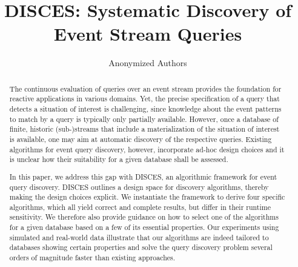 \documentclass[sigconf,review,screen]{acmart}
\newcommand{\sys}{DISCES\xspace}
\begin{document}
	\title{\sys{}: Systematic Discovery of Event Stream Queries}

	\author[Anonymized Authors]{Anonymized Authors}
	\affiliation{%
		\institution{}
		\city{\vspace{1cm}}
		\state{}
		\country{}
		\postcode{}
	}
	\email{}




\begin{abstract}
The continuous evaluation of queries over an event stream provides the
foundation for reactive applications in various domains. Yet, the precise
specification of a query that detects a situation of interest is challenging,
since knowledge about the event patterns to match by a query is typically only
partially available. However, once a database of finite, historic
(sub-)streams that include
a materialization of
the situation of interest is available, one may aim at automatic discovery of
the respective queries. Existing algorithms for event query discovery, however,
incorporate ad-hoc design choices and it is unclear how their suitability for a
given database shall be assessed.

In this paper, we address this gap with \sys{}, an algorithmic framework for
event query discovery. \sys{} outlines a design space for discovery algorithms,
thereby making the design choices explicit. We instantiate the
framework to derive four specific algorithms, which all yield correct and
complete results, but differ in their runtime sensitivity. We therefore also
provide guidance on how to select one of the algorithms for a given database
based on a few of its essential properties. Our experiments using simulated and
real-world data illustrate that our algorithms are indeed tailored to databases
showing certain properties and solve the query discovery problem several
orders of magnitude faster than existing approaches.
\end{abstract}

\maketitle













\clearpage




\clearpage

\end{document}
